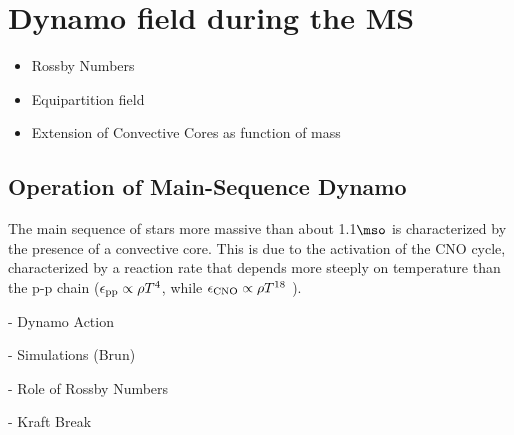 
  \section{Dynamo field during the MS}
\begin{itemize}
\item Rossby Numbers
\item Equipartition field
\item Extension of Convective Cores as function of mass
\end{itemize}


\subsection{Operation of Main-Sequence Dynamo}
The main sequence of stars more massive than about 1.1$\mso$ is characterized by the presence of a convective core.
This is due to the activation of the CNO cycle, characterized by a reaction rate that depends more steeply on temperature than the p-p chain ($\epsilon_{\rm pp}\propto \rho T^{4}$, while $\epsilon_{\rm CNO}\propto \rho T^{18}$ ).

- Dynamo Action

- Simulations (Brun)

- Role of Rossby Numbers

- Kraft Break
  
  
  